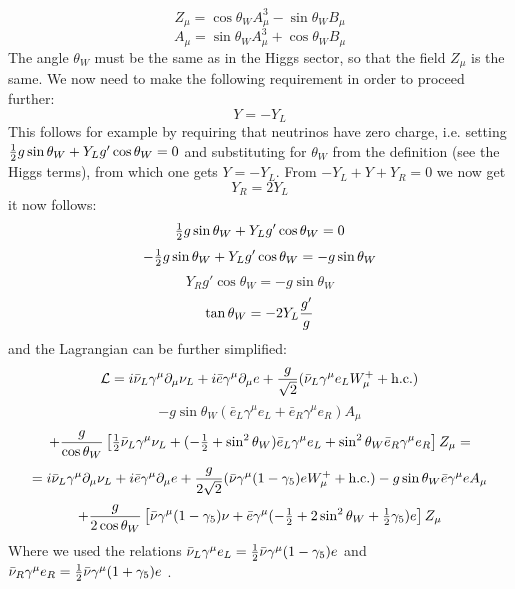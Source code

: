 \begin{equation*}
  Z_\mu= \cos\theta_W A^3_\mu - \sin\theta_W B_\mu
\end{equation*}
\begin{equation*}
  A_\mu= \sin\theta_W A^3_\mu + \cos\theta_W B_\mu
\end{equation*}
The angle $\theta_W$ must be the same as in the Higgs sector, so that the field $Z_\mu$ is the same. We now need to make the following requirement in order to proceed further: 
\begin{equation*}
  Y = -Y_L
\end{equation*}
This follows for example by requiring that neutrinos have zero charge, i.e. setting ${\textstyle{1\over2}} g\sin\theta_W+Y_Lg'\cos\theta_W = 0$ and substituting for $\theta_W$ from the definition (see the Higgs terms), from which one gets $Y=-Y_L$. From $-Y_L+Y+Y_R=0$ we now get 
\begin{equation*}
  Y_R = 2Y_L
\end{equation*}
it now follows: 
\begin{equation*}
  {\textstyle{1\over2}} g\sin\theta_W+Y_Lg'\cos\theta_W = 0
\end{equation*}
\begin{equation*}
  -{\textstyle{1\over2}} g\sin\theta_W +Y_Lg'\cos\theta_W = -g\sin\theta_W
\end{equation*}
\begin{equation*}
  Y_Rg'\cos\theta_W = -g\sin\theta_W
\end{equation*}
\begin{equation*}
  \tan\theta_W = -2Y_L {g'\over g}
\end{equation*}
and the Lagrangian can be further simplified: 
\begin{equation*}
  {\mathcal L}= i\bar\nu_L\gamma^\mu\partial_\mu\nu_L+i\bar e\gamma^\mu\partial_\mu e +{g\over\sqrt2}(\bar \nu_L\gamma^\mu e_L W^+_\mu + \hbox{h.c.})
\end{equation*}
\begin{equation*}
  -g\sin\theta_W(\bar e_L\gamma^\mu e_L+\bar e_R\gamma^\mu e_R) A_\mu
\end{equation*}
\begin{equation*}
  +{g\over\cos\theta_W}\left[ {\textstyle{1\over2}} \bar\nu_L\gamma^\mu\nu_L +(-{\textstyle{1\over2}} + \sin^2\theta_W)\bar e_L\gamma^\mu e_L +\sin^2\theta_W\bar e_R\gamma^\mu e_R \right]Z_\mu=
\end{equation*}
\begin{equation*}
  = i\bar\nu_L\gamma^\mu\partial_\mu\nu_L+i\bar e \gamma^\mu\partial_\mu e +{g\over2\sqrt2}(\bar \nu\gamma^\mu (1-\gamma_5) e W^+_\mu + \hbox{h.c.}) -g\sin\theta_W\bar e\gamma^\mu e A_\mu
\end{equation*}
\begin{equation*}
  +{g\over2\cos\theta_W}\left[ \bar\nu\gamma^\mu(1-\gamma_5)\nu +\bar e\gamma^\mu (-{\textstyle{1\over2}}+2\sin^2\theta_W+{\textstyle{1\over2}}\gamma_5) e \right]Z_\mu
\end{equation*}
Where we used the relations $\bar\nu_L\gamma^\mu e_L={\textstyle{1\over2}}\bar\nu\gamma^\mu (1-\gamma_5)e$ and $\bar\nu_R\gamma^\mu e_R={\textstyle{1\over2}}\bar\nu\gamma^\mu (1+\gamma_5)e$ .
